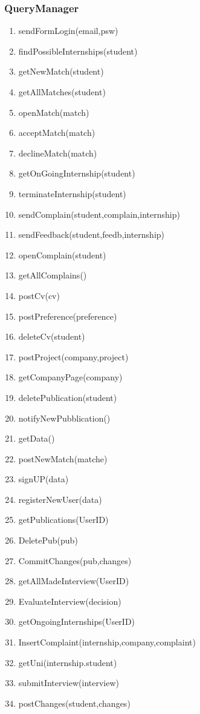 \documentclass{article}
\begin{document}
\subsubsection{QueryManager}
\begin{enumerate}
    \item sendFormLogin(email,psw)
    \item findPossibleInternships(student)
    \item getNewMatch(student)
    \item getAllMatches(student)
    \item openMatch(match)
    \item acceptMatch(match)
    \item declineMatch(match)
    \item getOnGoingInternship(student)
    \item terminateInternship(student)
    \item sendComplain(student,complain,internship)
    \item sendFeedback(student,feedb,internship)
    \item openComplain(student)
    \item getAllComplains()
    \item postCv(cv)
    \item postPreference(preference)
    \item deleteCv(student)
    \item postProject(company,project)
    \item getCompanyPage(company)
    \item deletePublication(student)
    \item notifyNewPubblication()
    \item getData()
    \item postNewMatch(matche)
    \item signUP(data)
    \item registerNewUser(data)
    \item getPublications(UserID)
    \item DeletePub(pub)
    \item CommitChanges(pub,changes)
    \item getAllMadeInterview(UserID)
    \item EvaluateInterview(decision)
    \item getOngoingInternships(UserID)
    \item InsertComplaint(internship,company,complaint)
    \item getUni(internship.student)
    \item submitInterview(interview)
    \item postChanges(student,changes)
\end{enumerate}
\end{document}
